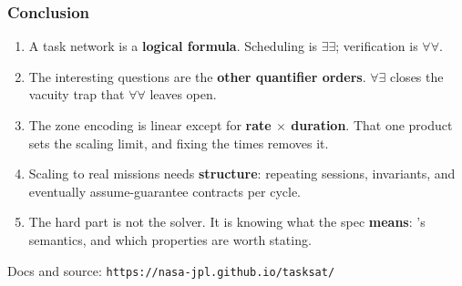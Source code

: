 \begin{frame}
  \frametitle{Conclusion} \small

\begin{enumerate}
\item A task network is a {\bf logical formula}. Scheduling is $\exists\exists$; verification is $\forall\forall$.
\pause
\item The interesting questions are the {\bf other quantifier orders}. $\forall\exists$ closes the
      vacuity trap that $\forall\forall$ leaves open.
\pause
\item The zone encoding is linear except for {\bf rate $\times$ duration}. That one product sets
      the scaling limit, and fixing the times removes it.
\pause
\item Scaling to real missions needs {\bf structure}: repeating sessions, invariants, and
      eventually assume-guarantee contracts per cycle.
\pause
\item The hard part is not the solver. It is knowing what the spec {\bf means}: \mexec{}'s semantics,
      and which properties are worth stating.
\end{enumerate}

\vspace{0.4cm}
{\centering\scriptsize Docs and source: {\tt https://nasa-jpl.github.io/tasksat/}\par}

\end{frame}

\begin{frame}

\vfill
{}

\vfill

\end{frame}
